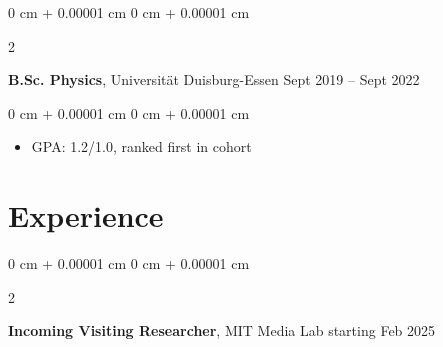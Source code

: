 \documentclass[10pt, letterpaper]{article}
\newenvironment{highlights}{
    \begin{itemize}[
        topsep=0.10 cm,
        parsep=0.10 cm,
        partopsep=0pt,
        itemsep=0pt,
        leftmargin=0 cm + 10pt
    ]
}{
    \end{itemize}
} %
\newenvironment{onecolentry}{
    \begin{adjustwidth}{
        0 cm + 0.00001 cm
    }{
        0 cm + 0.00001 cm
    }
}{
    \end{adjustwidth}
} %
\newenvironment{twocolentry}[2][]{
    \onecolentry
    \def\secondColumn{#2}
    \setcolumnwidth{\fill, 4.5 cm}
    \begin{paracol}{2}
}{
    \switchcolumn \raggedleft \secondColumn
    \end{paracol}
    \endonecolentry
} %
\begin{document}

        \vspace{0.2 cm}

        \begin{twocolentry}{
            Sept 2019 – Sept 2022
        }
            \textbf{B.Sc. Physics}, Universität Duisburg-Essen\end{twocolentry}

        \vspace{0.10 cm}
        \begin{onecolentry}
            \begin{highlights}
                \item GPA: 1.2/1.0, ranked first in cohort
            \end{highlights}
        \end{onecolentry}

    \section{Experience}









         \begin{twocolentry}{
            starting Feb 2025
        }
            \textbf{Incoming Visiting Researcher}, MIT Media Lab\end{twocolentry}
\end{document}
